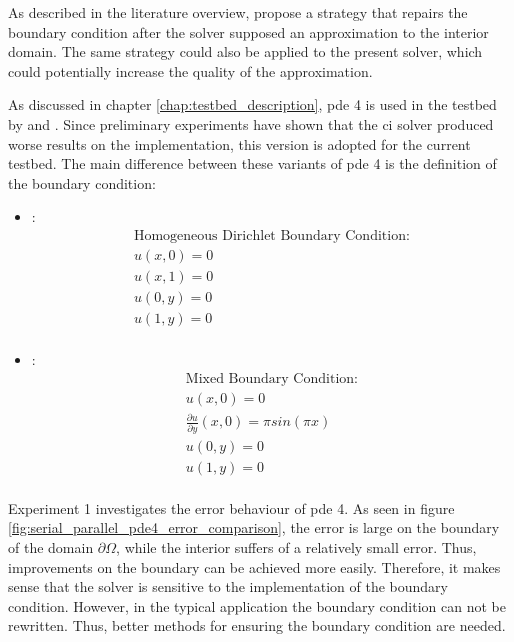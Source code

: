 \documentclass[./\jobname.tex]{subfiles}
\begin{document}
As described in the literature overview, \cite{kirstukas_hybrid_2005} propose a strategy that repairs the boundary condition after the solver supposed an approximation to the interior domain. The same strategy could also be applied to the present solver, which could potentially increase the quality of the approximation. 

As discussed in chapter \ref{chap:testbed_description}, \gls{pde} 4 is used in the testbed by \cite{chaquet_using_2019} and \cite{mitchell_nist_2018}. Since preliminary experiments have shown that the \gls{ci} solver produced worse results on the \cite{mitchell_nist_2018} implementation, this version is adopted for the current testbed. The main difference between these variants of \gls{pde} 4 is the definition of the boundary condition: 

\begin{itemize}
	\item \underline{\textbf{\cite{mitchell_nist_2018}}}: 
	\begin{equation*}
		\begin{split}
		\text{Homogeneous Dirichlet Boundary Condition:} \\
		u(x,0) = 0 \\
		u(x,1) = 0 \\
		u(0,y) = 0 \\
		u(1,y) = 0 \\
		\end{split}
	\end{equation*}
	\item \underline{\textbf{\cite{chaquet_using_2019}}}:
	\begin{equation*}
		\begin{split}
		\text{Mixed Boundary Condition:} \\
		u(x,0) = 0 \\
		\frac{\partial u}{\partial y} (x,0) = \pi sin(\pi x) \\
		u(0,y) = 0 \\
		u(1,y) = 0 \\
		\end{split}
	\end{equation*}
\end{itemize}

Experiment 1 investigates the error behaviour of \gls{pde} 4. As seen in figure \ref{fig:serial_parallel_pde4_error_comparison}, the error is large on the boundary of the domain $\partial \Omega$, while the interior suffers of a relatively small error. Thus, improvements on the boundary can be achieved more easily. Therefore, it makes sense that the solver is sensitive to the implementation of the boundary condition. However, in the typical application the boundary condition can not be rewritten. Thus, better methods for ensuring the boundary condition are needed. 
\end{document}
